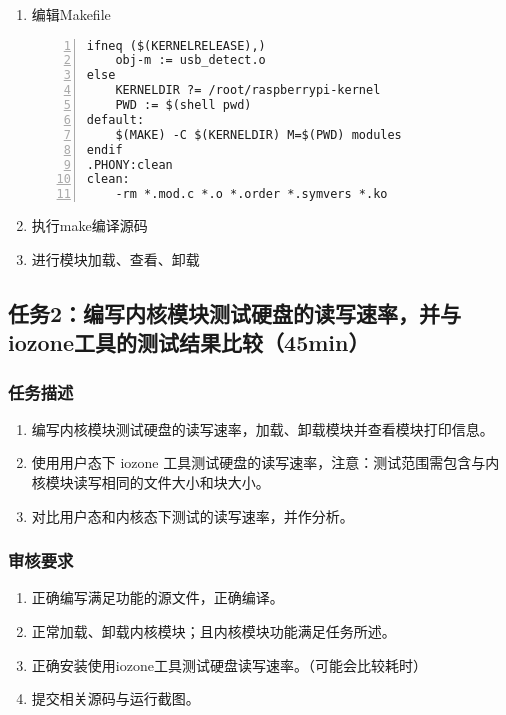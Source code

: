 \documentclass{article}
\begin{document}
\begin{enumerate}
\begin{lstlisting}[numbers=left]
\end{lstlisting}
    \item 编辑Makefile
\begin{lstlisting}[numbers=left]
ifneq ($(KERNELRELEASE),)
	obj-m := usb_detect.o
else
	KERNELDIR ?= /root/raspberrypi-kernel
	PWD := $(shell pwd)
default:
	$(MAKE) -C $(KERNELDIR) M=$(PWD) modules
endif
.PHONY:clean
clean:
	-rm *.mod.c *.o *.order *.symvers *.ko

\end{lstlisting}
    \item 执行make编译源码
    \item 进行模块加载、查看、卸载
\end{enumerate}

\newpage

\subsection{任务2：编写内核模块测试硬盘的读写速率，并与 iozone工具的测试结果比较（45min）}

\subsubsection{任务描述}
\begin{enumerate}
    \item 编写内核模块测试硬盘的读写速率，加载、卸载模块并查看模块打印信息。
    \item 使用用户态下 iozone 工具测试硬盘的读写速率，注意：测试范围需包含与内核模块读写相同的文件大小和块大小。
    \item 对比用户态和内核态下测试的读写速率，并作分析。
\end{enumerate}

\subsubsection{审核要求}
\begin{enumerate}
    \item 正确编写满足功能的源文件，正确编译。
    \item 正常加载、卸载内核模块；且内核模块功能满足任务所述。
    \item 正确安装使用iozone工具测试硬盘读写速率。（可能会比较耗时）
    \item 提交相关源码与运行截图。
\end{enumerate}
\end{document}

